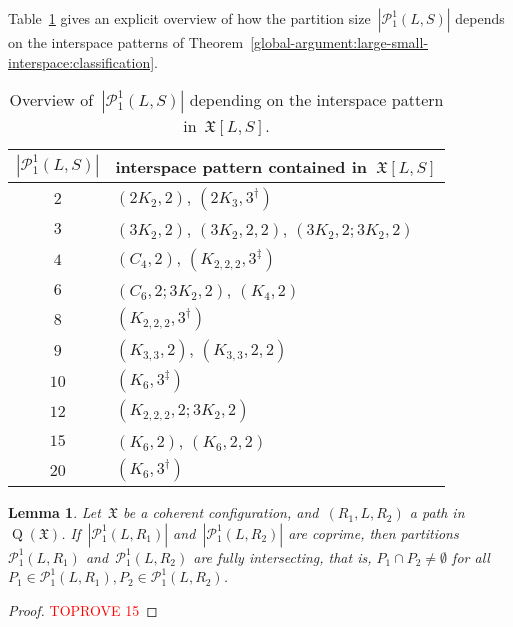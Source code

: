 \documentclass[english,a4paper]{article}
\theoremstyle{plain}
\newtheorem{lemma}      [theorem]{Lemma}
\theoremstyle{definition}
\newcommand{\abs}[1]{| #1 |}
\newcommand{\coherentConfig}{\ensuremath{\mathfrak{X}}}
\newcommand{\interspace}[2]{\ensuremath{\coherentConfig[#1,#2]}}
\DeclareMathOperator*{\Quotient}{Q}
\newcommand{\quotientGraph}[1]{\ensuremath{\Quotient(#1)}}
\newcommand{\partition}[1]{\ensuremath{\mathcal{P}^1_1(#1)}}
\newcommand{\ipfourClique}  {\ensuremath{(\clique{4},2)}}
\newcommand{\ipfourMatching}{\ensuremath{(\disjointCliques{2}{2},2)}}
\newcommand{\ipfourCycle}   {\ensuremath{(\cycle{4},2)}}
\newcommand{\ipsixCliqueTwo}     {\ensuremath{(\clique{6},2)}}
\newcommand{\ipsixCliqueTwoTwice}{\ensuremath{(\clique{6},2,2)}}
\newcommand{\ipsixCliqueThree}   {\ensuremath{(\clique{6},3^\dag)}}
\newcommand{\ipsixCliqueThreeD}	 {\ensuremath{(\clique{6},3^\ddag)}}
\newcommand{\ipsixMatching}             {\ensuremath{(\disjointCliques{3}{2},2)}}
\newcommand{\ipsixMatchingTwice}        {\ensuremath{(\disjointCliques{3}{2},2,2)}}
\newcommand{\ipsixMatchingMatching}     {\ensuremath{(\disjointCliques{3}{2},2;\disjointCliques{3}{2},2)}}
\newcommand{\ipsixMatchingAndCycle}     {\ensuremath{(\cycle{6},2;\disjointCliques{3}{2},2)}}
\newcommand{\ipsixMatchingAndComplement}{\ensuremath{(\clique{2,2,2},2;\disjointCliques{3}{2},2)}}
\newcommand{\ipsixTriangle}               {\ensuremath{(\disjointCliques{2}{3},3^\dag)}}
\newcommand{\ipsixTriangleComplement}     {\ensuremath{(\clique{3,3},2)}}
\newcommand{\ipsixTriangleComplementTwice}{\ensuremath{(\clique{3,3},2,2)}}
\newcommand{\ipsixMatchingComplement} {\ensuremath{(\clique{2,2,2},3^\dag)}}
\newcommand{\ipsixMatchingComplementD}{\ensuremath{(\clique{2,2,2},3^\ddag)}}
\newcommand{\clique}[1]{\ensuremath{K_{#1}}}
\newcommand{\cycle}[1]{\ensuremath{C_{#1}}}
\newcommand{\disjointCliques}[2]{\ensuremath{#1 \clique{#2}}}
\begin{document}
Table~\ref{interspace-pattern:partition-size/tab} gives an explicit overview of how the partition size~$\abs{\partition{L,S}}$ depends on the interspace patterns of Theorem~\ref{global-argument:large-small-interspace:classification}.




\begin{table}[tbp]
    \centering{}\begin{tabular}{|c|l|}
        \hline
        $\abs{\partition{L,S}}$ & interspace pattern contained in~$\interspace{L}{S}$                   \\ \hline
        $2$                     & $\ipfourMatching$, $\ipsixTriangle$                                   \\ \hline
        $3$                     & $\ipsixMatching$, $\ipsixMatchingTwice$, $\ipsixMatchingMatching$     \\ \hline
        $4$                     & $\ipfourCycle$, $\ipsixMatchingComplementD$                           \\ \hline
        $6$                     & $\ipsixMatchingAndCycle$, $\ipfourClique$                             \\ \hline
        $8$                     & $\ipsixMatchingComplement$                                            \\ \hline
        $9$                     & $\ipsixTriangleComplement$, $\ipsixTriangleComplementTwice$           \\ \hline
        $10$                    & $\ipsixCliqueThreeD$                                                  \\ \hline
        $12$                    & $\ipsixMatchingAndComplement$                                         \\ \hline
        $15$                    & $\ipsixCliqueTwo$, $\ipsixCliqueTwoTwice$                             \\ \hline
        $20$                    & $\ipsixCliqueThree$                                                   \\ \hline
    \end{tabular}
    \caption{Overview of~$\abs{\partition{L,S}}$ depending on the interspace pattern in~$\interspace{L}{S}$.}
    \label{interspace-pattern:partition-size/tab}
\end{table}

 

\begin{lemma}
\label{global-argument:partition:fully-intersecting/lem}
    Let~$\coherentConfig$ be a coherent configuration, and~$(R_1, L, R_2)$ a path in~$\quotientGraph{\coherentConfig}$.
    If~$\abs{\partition{L,R_1}}$ and~$\abs{\partition{L,R_2}}$ are coprime, then partitions~$\partition{L,R_1}$ and~$\partition{L, R_2}$ are \emph{fully intersecting}, that is, $P_1 \cap P_2 \neq \emptyset$ for all~$P_1 \in \partition{L,R_1}, P_2 \in \partition{L,R_2}$.
\end{lemma}
\begin{proof}\textcolor{red}{TOPROVE 15}\end{proof}
\end{document}
